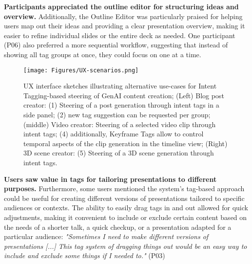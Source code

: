 \textbf{Participants appreciated the outline editor for structuring ideas and overview.}
Additionally, the Outline Editor was particularly praised for helping users map out their ideas and providing a clear presentation overview, making it easier to refine individual slides or the entire deck as needed. 
One participant (P06) also preferred a more sequential workflow, suggesting that instead of showing all tag groups at once, they could focus on one at a time. 


\begin{figure*}[t]
  \centering
  \texttt{[image: Figures/UX-scenarios.png]}
  \caption{UX interface sketches illustrating alternative use-cases for Intent Tagging-based steering of GenAI content creation; (Left) Blog post creator: (1) Steering of a post generation through intent tags in a side panel; (2) new tag suggestion can be requested per group; (middle) Video creator: Steering of a selected video clip through intent tags; (4) additionally, Keyframe Tags allow to control temporal aspects of the clip generation in the timeline view; (Right) 3D scene creator: (5) Steering of a 3D scene generation through intent tags.  }
  \label{fig:ux-scenarios}
\end{figure*}



\textbf{Users saw value in tags for tailoring presentations to different purposes.}
Furthermore, some users mentioned the system’s tag-based approach could be useful for creating different versions of presentations tailored to specific audiences or contexts. The ability to easily drag tags in and out allowed for quick adjustments, making it convenient to include or exclude certain content based on the needs of a shorter talk, a quick checkup, or a presentation adapted for a particular audience:
\textit{"Sometimes I need to make different versions of presentations [...] This tag system of dragging things out would be an easy way to include and exclude some things if I needed to."} (P03)


